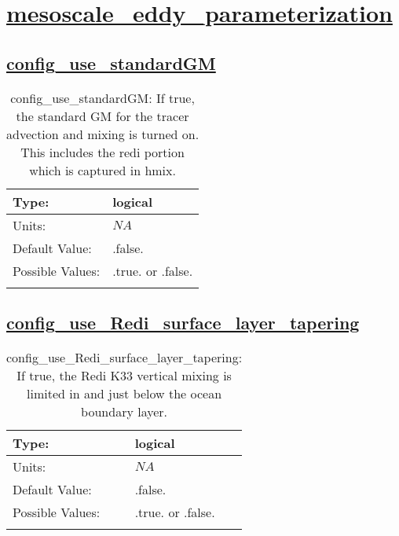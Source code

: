 \section[mesoscale\_eddy\_parameterization]{\hyperref[sec:nm_tab_mesoscale_eddy_parameterization]{mesoscale\_eddy\_parameterization}}
\label{sec:nm_sec_mesoscale_eddy_parameterization}
\subsection[config\_use\_standardGM]{\hyperref[sec:nm_tab_mesoscale_eddy_parameterization]{config\_use\_standardGM}}
\label{subsec:nm_sec_config_use_standardGM}
\begin{center}
\begin{longtable}{| p{2.0in} || p{4.0in} |}
    \hline
    Type: & logical \\
    \hline
    Units: & $NA$ \\
    \hline
    Default Value: & .false. \\
    \hline
    Possible Values: & .true. or .false. \\
    \hline
    \caption{config\_use\_standardGM: If true, the standard GM for the tracer advection and mixing is turned on. This includes the redi portion which is captured in hmix.}
\end{longtable}
\end{center}
\subsection[config\_use\_Redi\_surface\_layer\_tapering]{\hyperref[sec:nm_tab_mesoscale_eddy_parameterization]{config\_use\_Redi\_surface\_layer\_tapering}}
\label{subsec:nm_sec_config_use_Redi_surface_layer_tapering}
\begin{center}
\begin{longtable}{| p{2.0in} || p{4.0in} |}
    \hline
    Type: & logical \\
    \hline
    Units: & $NA$ \\
    \hline
    Default Value: & .false. \\
    \hline
    Possible Values: & .true. or .false. \\
    \hline
    \caption{config\_use\_Redi\_surface\_layer\_tapering: If true, the Redi K33 vertical mixing is limited in and just below the ocean boundary layer.}
\end{longtable}
\end{center}
